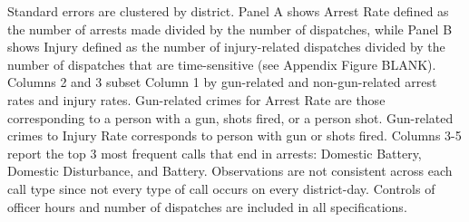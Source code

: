 \begin{table}[H]
\begin{threeparttable}
\begin{tablenotes}
\item Standard errors are clustered by district.                   Panel A shows Arrest Rate defined as the number of arrests made                  divided by the number of dispatches, while Panel B shows Injury defined as the                  number of injury-related dispatches divided by the number of dispatches that are time-sensitive (see Appendix Figure BLANK).                   Columns 2 and 3 subset Column 1 by gun-related and non-gun-related arrest rates and injury rates.                  Gun-related crimes for Arrest Rate are those corresponding to a person with a gun,                  shots fired, or a person shot. Gun-related crimes to Injury Rate corresponds to                  person with gun or shots fired.                  Columns 3-5 report the                   top 3 most frequent calls that end in arrests: Domestic Battery,                  Domestic Disturbance, and Battery. Observations are not consistent across each                  call type since not every type of call occurs on every district-day. Controls                  of officer hours and number of dispatches                  are included in all specifications.                   
\end{tablenotes}
\end{threeparttable}
\end{table}
